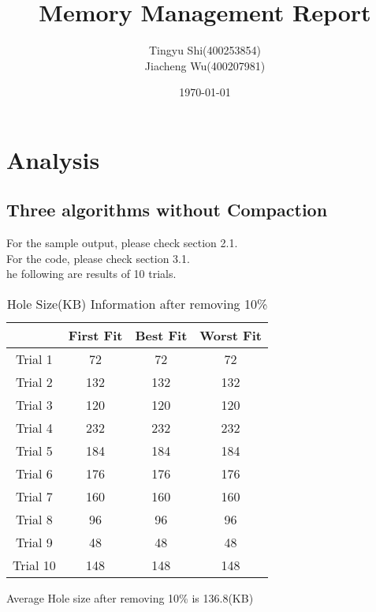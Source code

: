 \documentclass[12pt]{article}
\title{Memory Management Report}
\author{
Tingyu Shi(400253854)\\
Jiacheng Wu(400207981)}
\date{\today}
\begin{document}
\maketitle %
\newpage
\section{Analysis}
\subsection{Three algorithms without Compaction}
For the sample output, please check section 2.1.\\
For the code, please check section 3.1.\\
he following are results of 10 trials.
\begin{table}[h!]
\centering
\begin{tabular}{|c|c|c|c|}
\hline
         & First Fit & Best Fit & Worst Fit \\ \hline
Trial 1  & 72        & 72       & 72        \\ \hline
Trial 2  & 132       & 132      & 132       \\ \hline
Trial 3  & 120       & 120      & 120       \\ \hline
Trial 4  & 232       & 232      & 232       \\ \hline
Trial 5  & 184       & 184      & 184       \\ \hline
Trial 6  & 176       & 176      & 176        \\ \hline
Trial 7  & 160       & 160      & 160       \\ \hline
Trial 8  & 96        & 96       & 96       \\ \hline
Trial 9  & 48        & 48       & 48       \\ \hline
Trial 10 & 148       & 148      & 148        \\ \hline
\end{tabular}
\caption{Hole Size(KB) Information after removing 10\% }
\end{table}

\noindent Average Hole size after removing 10\% is 136.8(KB) 
\end{document}
